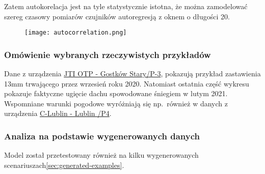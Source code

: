 Zatem autokorelacja jest na tyle statystycznie istotna, że można zamodelować szereg czasowy pomiarów czujników autoregresją z oknem o długości 20.
\begin{figure}[H]
    \texttt{[image: autocorrelation.png]}
    \label{fig:autocorrelation}
\end{figure}

\subsubsection{Omówienie wybranych rzeczywistych przykładów}

Dane z urządzenia \hyperref[fig:example812]{JTI OTP - Gostków Stary/P-3}, pokazują przykład zastawienia 13mm trwającego przez wrzesień roku 2020.
Natomiast ostatnia część wykresu pokazuje faktyczne ugięcie dachu spowodowane śniegiem w lutym 2021.
Wspomniane warunki pogodowe wyróżniają się np.\ również w danych z urządzenia \hyperref[fig:example201]{C-Lublin - Lublin /P4}.

\subsubsection{Analiza na podstawie wygenerowanych danych}

Model został przetestowany również na kilku wygenerowanych scenariuszach\ref{sec:generated-examples}.
\subsubsection{}